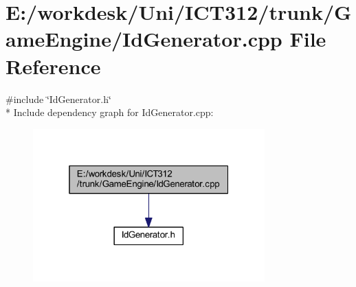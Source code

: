 \section{E\+:/workdesk/\+Uni/\+I\+C\+T312/trunk/\+Game\+Engine/\+Id\+Generator.cpp File Reference}
\label{_id_generator_8cpp}
{\ttfamily \#include \char`\"{}Id\+Generator.\+h\char`\"{}}\\*
Include dependency graph for Id\+Generator.\+cpp\+:\nopagebreak
\begin{figure}[H]
\begin{center}
\leavevmode
\includegraphics[width=253pt]{d9/dbd/_id_generator_8cpp__incl}
\end{center}
\end{figure}
